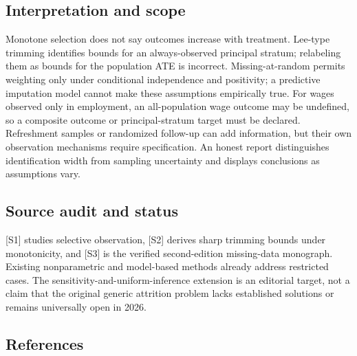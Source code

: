 \documentclass[11pt,a4paper]{article}
\begin{document}
\subsection*{Interpretation and scope}

Monotone selection does not say outcomes increase with treatment. Lee-type trimming identifies bounds for an always-observed principal stratum; relabeling them as bounds for the population ATE is incorrect. Missing-at-random permits weighting only under conditional independence and positivity; a predictive imputation model cannot make these assumptions empirically true. For wages observed only in employment, an all-population wage outcome may be undefined, so a composite outcome or principal-stratum target must be declared. Refreshment samples or randomized follow-up can add information, but their own observation mechanisms require specification. An honest report distinguishes identification width from sampling uncertainty and displays conclusions as assumptions vary.

\subsection*{Source audit and status}

[S1] studies selective observation, [S2] derives sharp trimming bounds under monotonicity, and [S3] is the verified second-edition missing-data monograph. Existing nonparametric and model-based methods already address restricted cases. The sensitivity-and-uniform-inference extension is an editorial target, not a claim that the original generic attrition problem lacks established solutions or remains universally open in 2026.

\subsection*{References}
\end{document}
